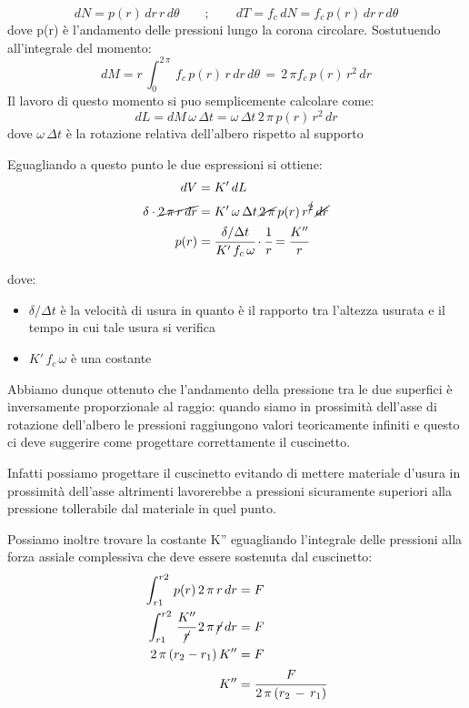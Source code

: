 \[dN = p(r)\,dr\,r\,d\theta \qquad;\qquad dT = f_c\,dN = f_c\,p(r)\,dr\,r\,d\theta\]
dove p(r) è l'andamento delle pressioni lungo la corona circolare. Sostutuendo all'integrale del momento:
\[dM = r\,\int_{0}^{2\,\pi}\,f_c\,p(r)\,r\,dr\,d\theta\,=\,2\,\pi f_c\,p(r)\,r^2\,dr\]
Il lavoro di questo momento si puo semplicemente calcolare come:
\[dL = dM\,\omega\,\Delta t = \omega\,\Delta t \,2\,\pi\,p(r)\,r^2\,dr\]
dove $\omega\,\Delta t$ è la rotazione relativa dell'albero rispetto al supporto

Eguagliando a questo punto le due espressioni si ottiene:
\begin{align*}
dV &= K'\,dL\\
\delta \cdot \cancel{2\,\pi\,r\,dr} &= K'\, \omega\,\Delta t \,\cancel{2\,\pi}\,p(r)\,r^{\cancel{2}}\,\cancel{dr}\\
p(r) &= \cfrac{\delta/\Delta t}{K'\,f_c\,\omega}\cdot\cfrac{1}{r} = \cfrac{K''}{r}
\end{align*}

dove:
\begin{itemize}
\item $\delta / \Delta t$ è la velocità di usura in quanto è il rapporto tra l'altezza usurata e il tempo in cui tale usura si verifica 
\item $K'\,f_c\,\omega$ è una costante
\end{itemize}

Abbiamo dunque ottenuto che l'andamento della pressione tra le due superfici è inversamente proporzionale al raggio: quando siamo in prossimità dell'asse di rotazione dell'albero le pressioni raggiungono valori teoricamente infiniti e questo ci deve suggerire come progettare correttamente il cuscinetto.

Infatti possiamo progettare il cuscinetto evitando di mettere materiale d'usura in prossimità dell'asse altrimenti lavorerebbe a pressioni sicuramente superiori alla pressione tollerabile dal materiale in quel punto.

Possiamo inoltre trovare la costante K'' eguagliando l'integrale delle pressioni alla forza assiale complessiva che deve essere sostenuta dal cuscinetto:
\begin{align*}
\int_{r1}^{r2}\,p(r)\,2\,\pi\,r\,dr &= F\\
\int_{r1}^{r2}\,\cfrac{K''}{\cancel{r}}\,2\,\pi\,\cancel{r}\,dr &= F\\
2\,\pi\,(r_2 - r_1)\,K'' &=F\\
K'' &= \cfrac{F}{2\,\pi\,(r_2\,-\,r_1)}
\end{align*}

